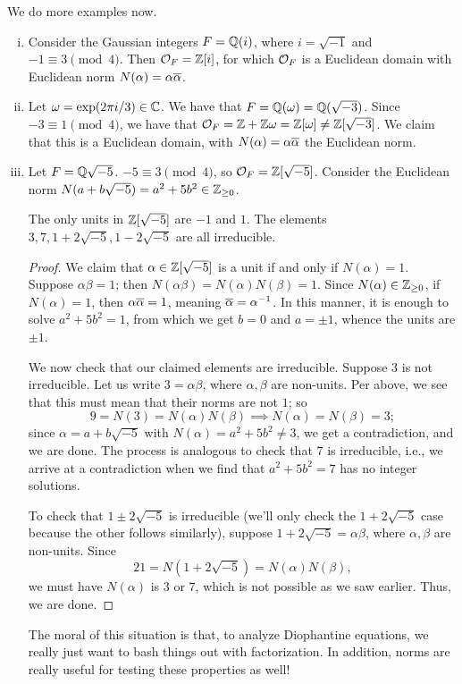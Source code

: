 We do more examples now.
\begin{enumerate}[(i)]
    \item Consider the Gaussian integers $F = \mathbb Q(i)$, where $i = \sqrt{-1}$ and $-1 \equiv 3 \pmod{4}$. Then $\mathcal O_F = \mathbb Z[i]$, for which $\mathcal O_F$ is a Euclidean domain with Euclidean norm $N(\alpha) = \alpha \overline \alpha$.
    \item Let $\omega = \exp(2\pi i / 3) \in \mathbb C$. We have that $F = \mathbb Q(\omega) = \mathbb Q(\sqrt{-3})$. Since $-3 \equiv 1 \pmod{4}$, we have that $\mathcal O_F = \mathbb Z + \mathbb Z \omega = \mathbb Z[\omega] \neq \mathbb Z[\sqrt{-3}]$. We claim that this is a Euclidean domain, with $N(\alpha) = \alpha \overline \alpha$ the Euclidean norm.
    \item Let $F = \mathbb Q{\sqrt{-5}}$. $-5 \equiv 3 \pmod{4}$, so $\mathcal O_F = \mathbb Z[\sqrt{-5}]$. Consider the Euclidean norm $N(a + b \sqrt{-5}) = a^2 + 5 b^2 \in \mathbb Z_{\geq 0}$. 
    \begin{lemma}
        The only units in $\mathbb Z[\sqrt{-5}]$ are $-1$ and $1$. The elements $3, 7, 1 + 2 \sqrt{-5}, 1 - 2 \sqrt{-5}$ are all irreducible.
    \end{lemma}
    \begin{proof}
        We claim that $\alpha \in \mathbb Z[\sqrt{-5}]$ is a unit if and only if $N(\alpha) = 1$. Suppose $\alpha \beta = 1$; then $N(\alpha \beta) = N(\alpha) N(\beta) = 1$. Since $N(\alpha) \in \mathbb Z_{\geq 0}$, if $N(\alpha) = 1$, then $\alpha \overline \alpha = 1$, meaning $\overline \alpha = \alpha^{-1}$. In this manner, it is enough to solve $a^2 + 5b^2 = 1$, from which we get $b = 0$ and $a = \pm 1$, whence the units are $\pm 1$.

        We now check that our claimed elements are irreducible. Suppose $3$ is not irreducible. Let us write $3 = \alpha \beta$, where $\alpha, \beta$ are non-units. Per above, we see that this must mean that their norms are not $1$; so
        \[ 9 = N(3) = N(\alpha) N(\beta) \implies N(\alpha) = N(\beta) = 3; \]
        since $\alpha = a + b \sqrt{-5}$ with $N(\alpha) = a^2 + 5b^2 \neq 3$, we get a contradiction, and we are done. The process is analogous to check that $7$ is irreducible, i.e., we arrive at a contradiction when we find that $a^2 + 5b^2 = 7$ has no integer solutions.

        \newpage
        To check that $1 \pm 2 \sqrt{-5}$ is irreducible (we'll only check the $1 + 2 \sqrt{-5}$ case because the other follows similarly), suppose $1 + 2 \sqrt{-5} = \alpha \beta$, where $\alpha, \beta$ are non-units. Since
        \[ 21 = N(1 + 2 \sqrt{-5}) = N(\alpha) N(\beta), \]
        we must have $N(\alpha)$ is $3$ or $7$, which is not possible as we saw earlier. Thus, we are done.
    \end{proof}
    {\color{airforceblue} The moral of this situation is that, to analyze Diophantine equations, we really just want to bash things out with factorization. In addition, norms are really useful for testing these properties as well!}
\end{enumerate}

